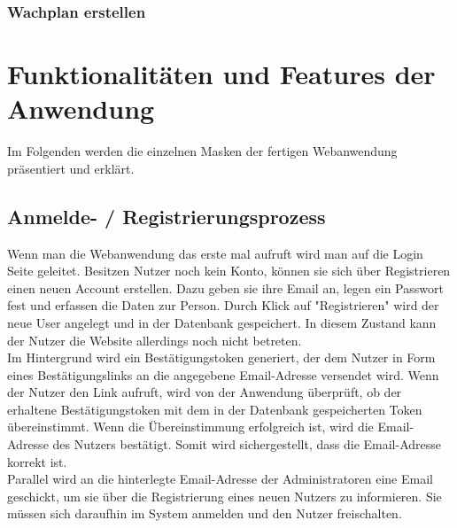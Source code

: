 \documentclass[fontsize=12pt,openright,oneside,paper=a4,BCOR=1cm]{scrbook}
\begin{document}
\subsubsection{Wachplan erstellen}


\section{Funktionalitäten und Features der Anwendung}

Im Folgenden werden die einzelnen Masken der fertigen Webanwendung präsentiert und erklärt.

\subsection{Anmelde- / Registrierungsprozess}

Wenn man die Webanwendung das erste mal aufruft wird man auf die Login Seite geleitet. Besitzen Nutzer noch kein Konto, können sie sich über Registrieren einen neuen Account erstellen. Dazu geben sie ihre Email an, legen ein Passwort fest und erfassen die Daten zur Person. Durch Klick auf "Registrieren" wird der neue User angelegt und in der Datenbank gespeichert. In diesem Zustand kann der Nutzer die Website allerdings noch nicht betreten. \\
Im Hintergrund wird ein Bestätigungstoken generiert, der dem Nutzer in Form eines Bestätigungslinks an die angegebene Email-Adresse versendet wird. Wenn der Nutzer den Link aufruft, wird von der Anwendung überprüft, ob der erhaltene Bestätigungstoken mit dem in der Datenbank gespeicherten Token übereinstimmt. Wenn die Übereinstimmung erfolgreich ist, wird die Email-Adresse des Nutzers bestätigt. Somit wird sichergestellt, dass die Email-Adresse korrekt ist. \\
Parallel wird an die hinterlegte Email-Adresse der Administratoren eine Email geschickt, um sie über die Registrierung eines neuen Nutzers zu informieren. Sie müssen sich daraufhin im System anmelden und den Nutzer freischalten.
\end{document}
